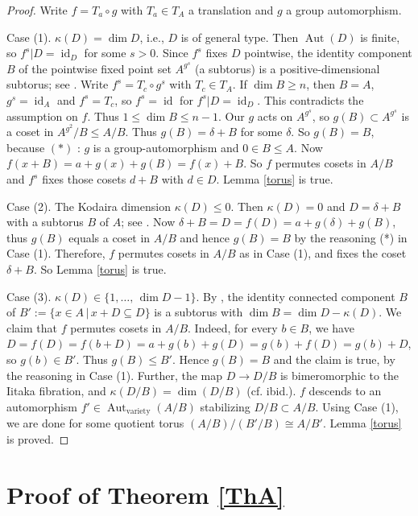 \documentclass[11pt,a4paper,psamsfonts]{amsart}
\theoremstyle{plain}
\theoremstyle{definition}
\theoremstyle{remark}
\begin{document}
\begin{proof}
Write $f = T_a \circ g$ with $T_a \in T_A$ a translation and $g$
a group automorphism.

Case (1). $\kappa(D) = \dim D$, i.e.,
$D$ is of general type. Then ${\operatorname{Aut}}(D)$ is finite, so
$f^s|D = {\operatorname{id}}_D$ for some $s > 0$.
Since $f^s$ fixes
$D$ pointwise,
the identity component $B$ of the pointwise fixed point set
$A^{g^s}$ (a subtorus)
is a positive-dimensional subtorus; see \cite[Lemma 13.1.1]{BL}.
Write $f^s = T_c \circ g^s$ with $T_c \in T_A$.
If $\dim B \ge n$, then $B = A$, $g^s = {\operatorname{id}}_A$ and $f^s = T_c$, so $f^s = {\operatorname{id}}$
for $f^s|D = {\operatorname{id}}_D$. This contradicts
the assumption on $f$. Thus $1 \le \dim B \le n-1$.
Our $g$ acts on $A^{g^s}$, so $g(B) \subset A^{g^s}$ is a coset
in $A^{g^2}/B \le A/B$. Thus $g(B) = \delta + B$ for some $\delta$.
So $g(B) = B$, because $(*)$ : $g$ is a group-automorphism
and $0 \in B \le A$.
Now $f(x + B) = a + g(x) + g(B) = f(x) + B$.
So $f$ permutes cosets in $A/B$
and $f^s$ fixes those cosets $d + B$ with $d \in D$.
Lemma \ref{torus} is true.

Case (2). The Kodaira dimension $\kappa(D) \le 0$.
Then $\kappa(D) = 0$ and
$D = \delta + B$ with a subtorus $B$ of $A$;
see \cite[Lemma 10.1, Theorem 10.3]{Ue}.
Now $\delta + B = D = f(D) = a + g(\delta) + g(B)$,
thus $g(B)$ equals a coset in $A/B$ and hence $g(B) = B$
by the reasoning (*) in Case (1).
Therefore, $f$ permutes cosets in $A/B$ as in Case (1),
and fixes the coset $\delta + B$. So
Lemma \ref{torus} is true.

Case (3). $\kappa(D) \in \{1, \dots, \, \dim D -1\}$.
By \cite[Theorem 10.9]{Ue},
the identity connected component $B$ of $B':= \{x \in A \, | \, x + D \subseteq D\}$
is a subtorus with $\dim B = \dim D - \kappa(D)$.
We claim that $f$ permutes cosets in $A/B$.
Indeed, for every $b \in B$, we have
$D = f(D) = f(b+D) = a + g(b) + g(D) = g(b) + f(D) = g(b) + D$,
so $g(b) \in B'$. Thus $g(B) \le B'$. Hence $g(B) = B$ and the claim is true,
by the reasoning in Case (1).
Further, the map $D \to D/B$ is bimeromorphic to the Iitaka fibration,
and $\kappa(D/B) = \dim (D/B)$ (cf. ibid.).
$f$ descends to an automorphism $f' \in {\operatorname{Aut}}_{\operatorname{variety}}(A/B)$
stabilizing $D/B \subset A/B$. Using Case (1), we are done
for some quotient torus $(A/B)/(B'/B) \cong A/B'$.
Lemma \ref{torus} is proved.
\end{proof}

\section{Proof of Theorem \ref{ThA}}
\end{document}
